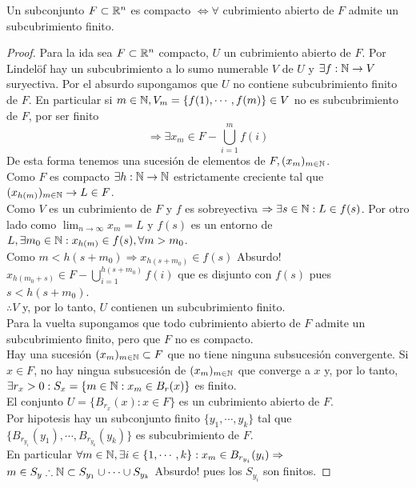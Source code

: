 \clearpage

\begin{corollary}
  Un subconjunto $F \subset \mathbb{R}^n$ es compacto $\iff \forall$ cubrimiento abierto de $F$ admite un subcubrimiento finito.
  \begin{proof}
    Para la ida sea $F \subset \mathbb{R}^n$ compacto, $U$ un cubrimiento abierto de $F$. Por Lindelöf hay un subcubrimiento a lo sumo numerable $V$ de $U$ y $\exists f: \mathbb{N} \to V$ suryectiva.
    Por el absurdo supongamos que $U$ no contiene subcubrimiento finito de $F$.
    En particular si $m \in \mathbb{N}, V_m = \{ f(1), \cdots, f(m) \} \in V$ no es subcubrimiento de $F$, por ser finito
    \begin{equation}
      \Rightarrow \exists x_m \in F - \bigcup_{i = 1}^m f(i)
    \end{equation} De esta forma tenemos una sucesión de elementos de $F, (x_m)_{m \in \mathbb{N}}$. \\
    Como $F$ es compacto $\exists h: \mathbb{N} \to \mathbb{N}$ estrictamente creciente tal que $(x_{h(m)})_{m \in \mathbb{N}} \to L \in F$. \\
    Como $V$ es un cubrimiento de $F$ y $f$ es sobreyectiva $\Rightarrow \exists s \in \mathbb{N} : L \in f(s)$.
    Por otro lado como $\lim_{n \to \infty} x_m = L$ y $f(s)$ es un entorno de $L, \exists m_0 \in \mathbb{N} : x_{h(m)} \in f(s), \forall m > m_0$. \\
    Como $m < h(s + m_0) \Rightarrow x_{h(s+m_0)} \in f(s)$ Absurdo! \\
    $x_{h(m_0 + s)} \in F - \bigcup_{i=1}^{h(s+m_0)} f(i)$ que es disjunto con $f(s)$ pues $s < h(s + m_0)$. \\
    $\therefore V$ y, por lo tanto, $U$ contienen un subcubrimiento finito. \\

    Para la vuelta supongamos que todo cubrimiento abierto de $F$ admite un
    subcubrimiento finito, pero que $F$ no es compacto. \\ Hay una sucesión
    $(x_m)_{m \in \mathbb{N}} \subset F$ que no tiene ninguna subsucesión convergente. Si
    $x \in F$, no hay ningua subsucesión de $(x_m)_{m \in \mathbb{N}}$ que converge a $x$
    y, por lo tanto, $\exists r_x > 0 : S_x = \{ m \in \mathbb{N} : x_m \in B_r(x) \}$ es
    finito. \\ El conjunto $U = \{ B_{r_x}(x) : x \in F \}$ es un cubrimiento
    abierto de $F$. \\ Por hipotesis hay un subconjunto finito $\{ y_1, \cdots,
      y_k\}$ tal que $\{ B_{r_{y_1}}(y_1), \cdots, B_{r_{y_k}}(y_k) \}$ es
    subcubrimiento de $F$. \\ En particular $\forall m \in \mathbb{N}, \exists i \in \{ 1,
      \cdots, k \} : x_m \in B_{r_{y_i}}(y_i) \Rightarrow$ \\ $m \in S_y \therefore
      \mathbb{N} \subset S_{y_1} \cup \cdots \cup S_{y_k}$ Absurdo! pues los $S_{y_i}$ son
    finitos.
  \end{proof}
\end{corollary}

